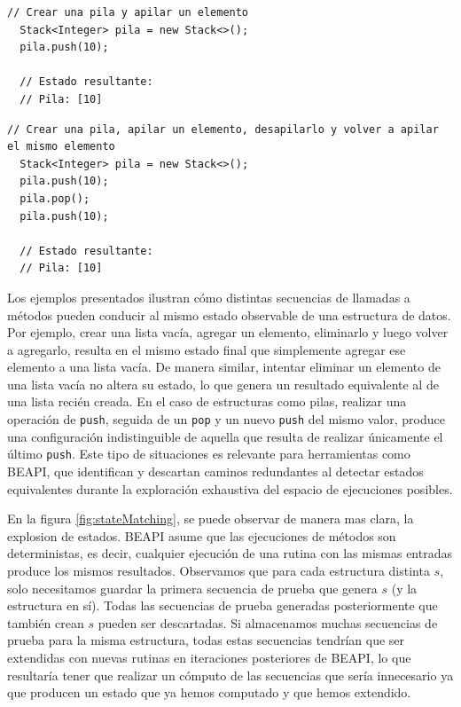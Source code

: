 \vspace{1em}

\begin{lstlisting}[numbers=none, caption={Crear una pila y apilar un elemento}, label={lst:push}, captionpos=b, frame=tb, basicstyle=\scriptsize]
  // Crear una pila y apilar un elemento
  Stack<Integer> pila = new Stack<>();
  pila.push(10);

  // Estado resultante:
  // Pila: [10]
\end{lstlisting}

\vspace{1em}

\begin{lstlisting}[numbers=none, caption={Push, pop y nuevo push en una pila}, label={lst:push-pop-push}, captionpos=b, frame=tb, basicstyle=\scriptsize]
  // Crear una pila, apilar un elemento, desapilarlo y volver a apilar el mismo elemento
  Stack<Integer> pila = new Stack<>();
  pila.push(10);
  pila.pop();
  pila.push(10);

  // Estado resultante:
  // Pila: [10]
\end{lstlisting}  

Los ejemplos presentados ilustran cómo distintas secuencias de llamadas a métodos pueden conducir al mismo estado observable de una estructura de datos. 
Por ejemplo, crear una lista vacía, agregar un elemento, eliminarlo y luego volver a agregarlo, resulta en el mismo estado final que simplemente agregar ese elemento a una lista vacía. 
De manera similar, intentar eliminar un elemento de una lista vacía no altera su estado, lo que genera un resultado equivalente al de una lista recién creada.
En el caso de estructuras como pilas, realizar una operación de \texttt{push}, seguida de un \texttt{pop} y un nuevo \texttt{push} del mismo valor, 
produce una configuración indistinguible de aquella que resulta de realizar únicamente el último \texttt{push}. 
Este tipo de situaciones es relevante para herramientas como \textsf{BEAPI}, 
que identifican y descartan caminos redundantes al detectar estados equivalentes durante la exploración exhaustiva del espacio de ejecuciones posibles.

En la figura \ref{fig:stateMatching}, se puede observar de manera mas clara, la explosion de estados.
\textsf{BEAPI} asume que las ejecuciones de métodos son deterministas, es decir, cualquier ejecución de una rutina con las mismas entradas produce los mismos resultados. 
Observamos que para cada estructura distinta $s$, solo necesitamos guardar la primera secuencia de prueba que genera $s$ (y la estructura en sí).
Todas las secuencias de prueba generadas posteriormente que también crean $s$ pueden ser descartadas. 
Si almacenamos muchas secuencias de prueba para la misma estructura, todas estas secuencias tendrían que ser extendidas con nuevas rutinas en iteraciones posteriores de \textsf{BEAPI}, 
lo que resultaría tener que realizar un cómputo de las secuencias que sería innecesario ya que producen un estado que ya hemos computado y que hemos extendido.  

